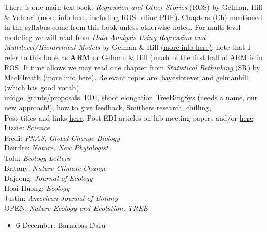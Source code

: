 \documentclass[11pt]{article}
\newenvironment{smitemize}{
\begin{itemize}
  \setlength{\itemsep}{0pt}
  \setlength{\parskip}{0.8pt}
  \setlength{\parsep}{0pt}}
{\end{itemize}
}
\begin{document}
There is one main textbook: \emph{Regression and Other Stories} (ROS) by Gelman, Hill \& Vehtari (\href{https://avehtari.github.io/ROS-Examples/}{more info here, including ROS online PDF}). Chapters (Ch) mentioned in the syllabus come from this book unless otherwise noted. For multi-level modeling we will read from \emph{Data Analysis Using Regression and Multilevel/Hierarchical Models} by Gelman \& Hill \href{http://www.stat.columbia.edu/~gelman/arm/}{(more info here)}; note that I refer to this book as {\bf ARM} or Gelman \& Hill (much of the first half of ARM is in ROS. If time allows we may read one chapter from \emph{Statistical Rethinking} (SR) by MacElreath \href{http://xcelab.net/rm/statistical-rethinking/}{(more info here)}. Relevant repos are: \href{https://github.com/temporalecologylab/bayesforever}{bayesforever} and \href{https://github.com/lizzieinvancouver/gelmanhill}{gelmanhill} (which has good vocab). \\
\vspace{6pt}
 midge, grants/proposals, EDI, shoot elongation TreeRingSys (needs a name, our new approach!), how to give feedback, Smithers research, chilling, \\
\vspace{7pt}
 Post titles and links \href{https://docs.google.com/document/d/1j0WdDbjdp8ERLSO7whvtnP-tOblYMlX33TSCXy_uRKo/edit?usp=sharing}{\underline{here}}. Post EDI articles on lab meeting papers and/or  \href{https://docs.google.com/document/d/18VbP-03oD0BsArxYm60g1ZvvFL7IoA3-6rpdHb1eLPw/edit#heading=h.gsqcglkhxkzg}{here}.\\

Lizzie: \emph{Science}\\
Fredi: \emph{PNAS, Global Change Biology}\\
Deirdre: \emph{Nature, New Phytologist}\\
Tolu: \emph{Ecology Letters}\\
Britany: \emph{Nature Climate Change}\\
Dajeong: \emph{Journal of Ecology}\\
Hoai Huong: \emph{Ecology}\\
Justin: \emph{American Journal of Botany}\\

OPEN: \emph{Nature Ecology and Evolution, TREE}\\


\vspace{6pt}
\vspace{-1ex}
\begin{smitemize}
\item 6 December: Barnabas Daru
\end{smitemize}
\end{document}
